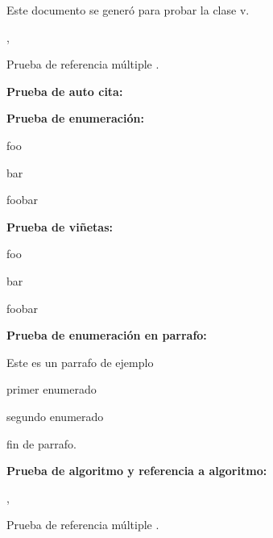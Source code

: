 
Este documento se generó para probar la clase  v\uclamscversion.


\label{primeraSec}


\label{segundaSec}


\label{terceraSec}

, 

Prueba de referencia múltiple  .

\break


\espaciodoble\textbf{Prueba de auto cita:}

\yo

\espaciodoble\textbf{Prueba de enumeración:}

\begin{enumeracion}
	\item foo
	\item bar
	\item foobar
\end{enumeracion}

\espaciodoble\textbf{Prueba de viñetas:}

\begin{vinetas}
	\item foo
	\item bar
	\item foobar
\end{vinetas}

\espaciodoble\textbf{Prueba de enumeración en parrafo:}

Este es un parrafo de ejemplo\begin{enumeracionenparrafo}
\item primer enumerado \item segundo enumerado\end{enumeracionenparrafo}
fin de parrafo.

\break

\espaciodoble\textbf{Prueba de algoritmo y referencia a algoritmo:}

, 

Prueba de referencia múltiple  .

